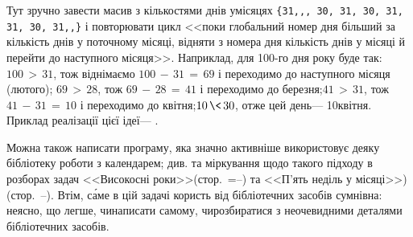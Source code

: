 \Tutorial
Тут зручно завести масив з кількостями днів у\nolinebreak[2] місяцях \texttt{\{31,,, 30, 31, 30, 31, 31, 30, 31,,\}} і повторювати цикл <<поки глобальний номер дня більший за кількість днів у поточному місяці, відняти з номера дня кількість днів у місяці й перейти до наступного місяця>>. Наприклад, для \mbox{100-го} дня року буде так: 
${100\,{>}\,31}$, тож віднімаємо ${100\,{-}\,31\,{=}\,69}$ і переходимо до наступного місяця (лютого);
${69\,{>}\,28}$, тож ${69\,{-}\,28\,{=}\,41}$ і переходимо до березня;\linebreak[3]
${41\,{>}\,31}$, тож ${41\,{-}\,31\,{=}\,10}$ і переходимо до квітня;\linebreak[3]
${10\,{\<}\,30}$, отже цей день\nolinebreak[3] --- 10\nolinebreak[3] квітня.
Приклад реалізації цієї ідеї\nolinebreak[3] --- .

Можна також написати програму, яка значно активніше використовує деяку бібліотеку роботи з календарем; див.  та міркування щодо такого підходу в розборах задач <<Високосні роки>>\nolinebreak[2] \mbox{(стор.~\pageref{text:leap-years-start}\ifnum{}=\else--\pageref{text:leap-years-finish}\fi)} та <<П'ять неділь у місяці>>)\nolinebreak[2] \mbox{(стор.~\pageref{text:5-sundays-per-month-start}--\pageref{text:5-sundays-per-month-finish})}. Втім, с\'{а}ме в цій задачі користь від бібліотечних засобів сумнівна: неясно, що легше, чи\nolinebreak[3] написати самому, чи\nolinebreak[3] розбиратися з неочевидними деталями бібліотечних засобів.